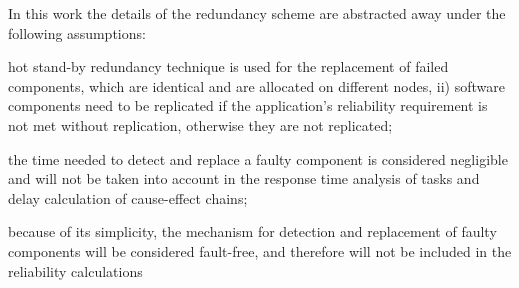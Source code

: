 {In this work the details of the redundancy scheme are abstracted away under the following assumptions:
\begin{enumerate*}[label=(\roman*)]
	\item hot stand-by redundancy technique is used for the replacement of failed components, which are identical and are allocated on different nodes, ii) software components need to be replicated if the application's reliability requirement is not met without replication, otherwise they are not replicated;
	\item the time needed to detect and replace a faulty component is considered negligible and will not be taken into account in the response time analysis of tasks and delay calculation of cause-effect chains;
	\item because of its simplicity, the mechanism for detection and replacement of faulty components will be considered fault-free, and therefore will not be included in the reliability calculations
\end{enumerate*}

}
